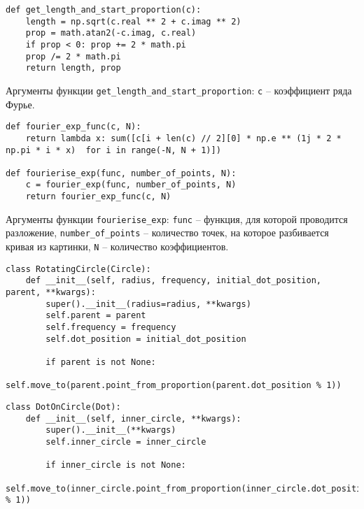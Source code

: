 \begin{lstlisting}[style=python_white, caption={Получение радиуса и начального положения}, label=lst:get_length_and_start_proportion, belowskip=-0.8\baselineskip]
def get_length_and_start_proportion(c):
    length = np.sqrt(c.real ** 2 + c.imag ** 2)
    prop = math.atan2(-c.imag, c.real) 
    if prop < 0: prop += 2 * math.pi
    prop /= 2 * math.pi
    return length, prop
\end{lstlisting}
Аргументы функции \texttt{get\_length\_and\_start\_proportion}: \texttt{c} -- коэффициент ряда Фурье. 
\newline

\begin{lstlisting}[style=python_white, caption={Получение частичной суммы ряда Фурье}, label=lst:fourierise_exp_cat, belowskip=-0.8\baselineskip]
def fourier_exp_func(c, N):
    return lambda x: sum([c[i + len(c) // 2][0] * np.e ** (1j * 2 * np.pi * i * x)  for i in range(-N, N + 1)])

def fourierise_exp(func, number_of_points, N):
    c = fourier_exp(func, number_of_points, N)
    return fourier_exp_func(c, N)
\end{lstlisting}
Аргументы функции \texttt{fourierise\_exp}: \texttt{func} -- функция, для которой проводится разложение, \texttt{number\_of\_points} -- количество точек, на которое разбивается кривая из картинки, \texttt{N} -- количество коэффициентов.
\newline

\begin{lstlisting}[style=python_white, label=lst:rotating_circle, caption={Исходный код класса окружности}]
class RotatingCircle(Circle):
    def __init__(self, radius, frequency, initial_dot_position, parent, **kwargs):
        super().__init__(radius=radius, **kwargs)
        self.parent = parent
        self.frequency = frequency
        self.dot_position = initial_dot_position

        if parent is not None:
            self.move_to(parent.point_from_proportion(parent.dot_position % 1))
\end{lstlisting}


\begin{lstlisting}[style=python_white, label=lst:dot_on_circle, caption={Исходный код класса точки на окружности}]
class DotOnCircle(Dot):
    def __init__(self, inner_circle, **kwargs):
        super().__init__(**kwargs)
        self.inner_circle = inner_circle

        if inner_circle is not None:
            self.move_to(inner_circle.point_from_proportion(inner_circle.dot_position % 1))
\end{lstlisting}


